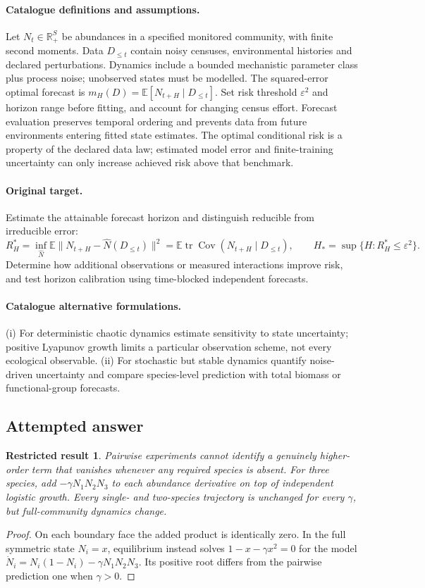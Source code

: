 \documentclass[11pt]{article}
\newcommand{\R}{\mathbb R}
\newcommand{\E}{\mathbb E}
\DeclareMathOperator{\Cov}{Cov}
\providecommand{\R}{\mathbb R}
\providecommand{\E}{\mathbb E}
\providecommand{\Cov}{\operatorname{Cov}}
\newtheorem{attemptresult}{Restricted result}[section]
\begin{document}
\paragraph{Catalogue definitions and assumptions.}
Let $N_t\in\R_+^S$ be abundances in a specified monitored community, with finite second moments. Data $D_{\le t}$ contain noisy censuses, environmental histories and declared perturbations. Dynamics include a bounded mechanistic parameter class plus process noise; unobserved states must be modelled. The squared-error optimal forecast is $m_H(D)=\E[N_{t+H}\mid D_{\le t}]$. Set risk threshold $\varepsilon^2$ and horizon range before fitting, and account for changing census effort. Forecast evaluation preserves temporal ordering and prevents data from future environments entering fitted state estimates. The optimal conditional risk is a property of the declared data law; estimated model error and finite-training uncertainty can only increase achieved risk above that benchmark.
\paragraph{Original target.}
Estimate the attainable forecast horizon and distinguish reducible from irreducible error:
\[
 R_H^*=\inf_{\widehat N}\E\|N_{t+H}-\widehat N(D_{\le t})\|^2
 =\E\operatorname{tr}\Cov(N_{t+H}\mid D_{\le t}),
 \qquad H_* =\sup\{H:R_H^*\le\varepsilon^2\}.
\]
Determine how additional observations or measured interactions improve risk, and test horizon calibration using time-blocked independent forecasts.
\paragraph{Catalogue alternative formulations.}
(i) For deterministic chaotic dynamics estimate sensitivity to state uncertainty; positive Lyapunov growth limits a particular observation scheme, not every ecological observable. (ii) For stochastic but stable dynamics quantify noise-driven uncertainty and compare species-level prediction with total biomass or functional-group forecasts.
\subsection{Attempted answer}
\begin{attemptresult}
Pairwise experiments cannot identify a genuinely higher-order term that vanishes whenever any required species is absent. For three species, add $-\gamma N_1N_2N_3$ to each abundance derivative on top of independent logistic growth. Every single- and two-species trajectory is unchanged for every $\gamma$, but full-community dynamics change.
\end{attemptresult}
\begin{proof}
On each boundary face the added product is identically zero. In the full symmetric state $N_i=x$, equilibrium instead solves $1-x-\gamma x^2=0$ for the model $\dot N_i=N_i(1-N_i)-\gamma N_1N_2N_3$. Its positive root differs from the pairwise prediction one when $\gamma>0$.
\end{proof}
\end{document}
